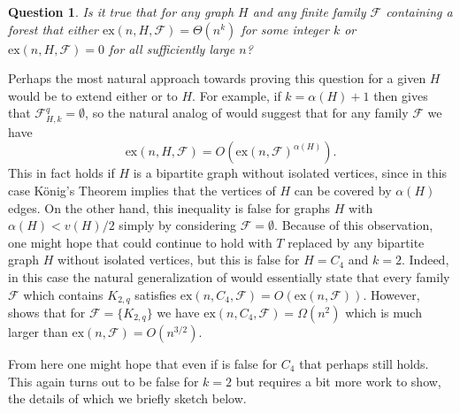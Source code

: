 \documentclass[12pt,letterpaper]{article}
\newtheorem{question}[theorem]{Question}
\theoremstyle{definition}
\newcommand{\ex}{\mathrm{ex}}
\renewcommand{\c}[1]{\mathcal{#1}}
\begin{document}
	\begin{question}
		Is it true that for any graph $H$ and any finite family $\c{F}$ containing a forest that either $\ex(n,H,\c{F})=\Theta(n^k)$ for some integer $k$ or $\ex(n,H,\c{F})=0$ for all sufficiently large $n$?
	\end{question}
	Perhaps the most natural approach towards proving this question for a given $H$ would be to extend either  or  to $H$. For example, if $k=\alpha(H)+1$ then  gives that $\c{F}_{H,k}^q=\emptyset$, so the natural analog of  would suggest that for any family $\c{F}$ we have
	\[
	\ex(n,H,\c{F})=O(\ex(n,\c{F})^{\alpha(H)}).
	\]
	This in fact holds if $H$ is a bipartite graph without isolated vertices, since in this case K\"onig's Theorem implies that the vertices of $H$ can be covered by $\alpha(H)$ edges.  On the other hand, this inequality is false for graphs $H$ with $\alpha(H)<v(H)/2$ simply by considering $\c{F}=\emptyset$.  Because of this observation, one might hope that  could continue to hold with $T$ replaced by any bipartite graph $H$ without isolated vertices, but this is false for $H=C_4$ and $k=2$.  Indeed, in this case the natural generalization of  would essentially state that every family $\c{F}$ which contains $K_{2,q}$ satisfies $\ex(n,C_4,\c{F})=O(\ex(n,\c{F}))$.  However,  shows that for $\c{F}=\{K_{2,q}\}$ we have $\ex(n,C_4,\c{F})=\Omega(n^2)$ which is much larger than $\ex(n,\c{F})=O(n^{3/2})$.   
	
	From here one might hope that even if  is false for $C_4$ that perhaps  still holds.  This again turns out to be false for $k=2$ but requires a bit more work to show, the details of which we briefly sketch below.
	
\end{document}
